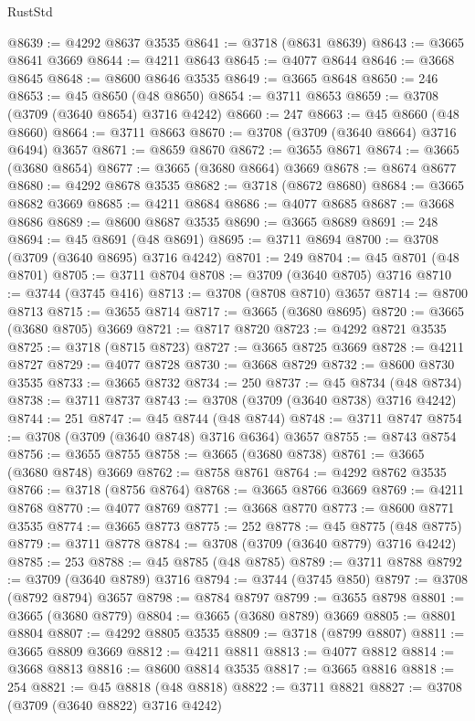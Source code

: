 \begin{lexlean}{RustStd}
\begin{coremodule}
@8639 := @4292 @8637 @3535
@8641 := @3718 (@8631 @8639)
@8643 := @3665 @8641 @3669
@8644 := @4211 @8643
@8645 := @4077 @8644
@8646 := @3668 @8645
@8648 := @8600 @8646 @3535
@8649 := @3665 @8648
@8650 := 246
@8653 := @45 @8650 (@48 @8650)
@8654 := @3711 @8653
@8659 := @3708 (@3709 (@3640 @8654) @3716 @4242)
@8660 := 247
@8663 := @45 @8660 (@48 @8660)
@8664 := @3711 @8663
@8670 := @3708 (@3709 (@3640 @8664) @3716 @6494) @3657
@8671 := @8659 @8670
@8672 := @3655 @8671
@8674 := @3665 (@3680 @8654)
@8677 := @3665 (@3680 @8664) @3669
@8678 := @8674 @8677
@8680 := @4292 @8678 @3535
@8682 := @3718 (@8672 @8680)
@8684 := @3665 @8682 @3669
@8685 := @4211 @8684
@8686 := @4077 @8685
@8687 := @3668 @8686
@8689 := @8600 @8687 @3535
@8690 := @3665 @8689
@8691 := 248
@8694 := @45 @8691 (@48 @8691)
@8695 := @3711 @8694
@8700 := @3708 (@3709 (@3640 @8695) @3716 @4242)
@8701 := 249
@8704 := @45 @8701 (@48 @8701)
@8705 := @3711 @8704
@8708 := @3709 (@3640 @8705) @3716
@8710 := @3744 (@3745 @416)
@8713 := @3708 (@8708 @8710) @3657
@8714 := @8700 @8713
@8715 := @3655 @8714
@8717 := @3665 (@3680 @8695)
@8720 := @3665 (@3680 @8705) @3669
@8721 := @8717 @8720
@8723 := @4292 @8721 @3535
@8725 := @3718 (@8715 @8723)
@8727 := @3665 @8725 @3669
@8728 := @4211 @8727
@8729 := @4077 @8728
@8730 := @3668 @8729
@8732 := @8600 @8730 @3535
@8733 := @3665 @8732
@8734 := 250
@8737 := @45 @8734 (@48 @8734)
@8738 := @3711 @8737
@8743 := @3708 (@3709 (@3640 @8738) @3716 @4242)
@8744 := 251
@8747 := @45 @8744 (@48 @8744)
@8748 := @3711 @8747
@8754 := @3708 (@3709 (@3640 @8748) @3716 @6364) @3657
@8755 := @8743 @8754
@8756 := @3655 @8755
@8758 := @3665 (@3680 @8738)
@8761 := @3665 (@3680 @8748) @3669
@8762 := @8758 @8761
@8764 := @4292 @8762 @3535
@8766 := @3718 (@8756 @8764)
@8768 := @3665 @8766 @3669
@8769 := @4211 @8768
@8770 := @4077 @8769
@8771 := @3668 @8770
@8773 := @8600 @8771 @3535
@8774 := @3665 @8773
@8775 := 252
@8778 := @45 @8775 (@48 @8775)
@8779 := @3711 @8778
@8784 := @3708 (@3709 (@3640 @8779) @3716 @4242)
@8785 := 253
@8788 := @45 @8785 (@48 @8785)
@8789 := @3711 @8788
@8792 := @3709 (@3640 @8789) @3716
@8794 := @3744 (@3745 @850)
@8797 := @3708 (@8792 @8794) @3657
@8798 := @8784 @8797
@8799 := @3655 @8798
@8801 := @3665 (@3680 @8779)
@8804 := @3665 (@3680 @8789) @3669
@8805 := @8801 @8804
@8807 := @4292 @8805 @3535
@8809 := @3718 (@8799 @8807)
@8811 := @3665 @8809 @3669
@8812 := @4211 @8811
@8813 := @4077 @8812
@8814 := @3668 @8813
@8816 := @8600 @8814 @3535
@8817 := @3665 @8816
@8818 := 254
@8821 := @45 @8818 (@48 @8818)
@8822 := @3711 @8821
@8827 := @3708 (@3709 (@3640 @8822) @3716 @4242)

\end{coremodule}
\end{lexlean}

